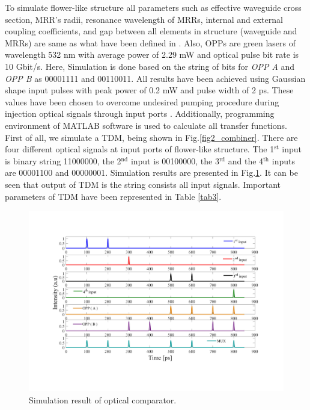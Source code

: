 \documentclass{osa-article}
\begin{document}
To simulate flower-like structure all parameters such as effective waveguide cross section, MRR’s radii, resonance wavelength of MRRs, internal and external coupling coefficients, and gap between all elements in structure (waveguide and MRRs)  are same as what have been defined in \cite{lalehsimulation}. Also, OPPs are green lasers of wavelength 532 nm with average power of 2.29 mW and optical pulse bit rate is 10 Gbit/s. Here, Simulation is done based on the string of bits for \textit{OPP A} and \textit{OPP B} as 00001111 and 00110011. All results have been achieved using Gaussian shape input pulses with peak power of 0.2 mW and pulse width of 2 ps. These values have been chosen to overcome undesired pumping procedure during injection optical signals through input ports \cite{lalehsimulation}. Additionally, programming environment of MATLAB software is used to calculate all transfer functions.
First of all, we simulate a TDM, being shown in Fig.\ref{fig2_combiner}. There are four different optical signals at input ports of flower-like structure. The 1$^{\text{st}}$ input is binary string 11000000, the 2$^{\text{nd}}$ input is 00100000, the 3$^{\text{rd}}$ and the 4$^{\text{th}}$ inputs are 00001100 and 00000001. Simulation results are presented in Fig.\ref{fig3_muxfi}. It can be seen that output of TDM is the string consists all input signals. Important parameters of TDM have been represented in Table \ref{tab3}.
\begin{figure}[tb]
\centering
\includegraphics[width=5 in]{figs/fig3_muxfi.pdf}
	\caption{Simulation result of optical comparator.}
	\label{fig3_muxfi}
\end{figure}
\end{document}
